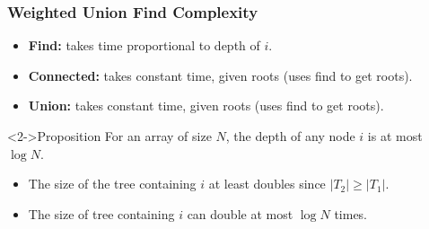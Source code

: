 \documentclass{beamer}
\begin{document}
\begin{frame}%
\frametitle{Weighted Union Find Complexity}

\scriptsize

\begin{itemize}
\item \textbf{Find:} takes time proportional to depth of $i$.\\

\vspace{0.1cm}

\item \textbf{Connected:} takes constant time, given roots (uses find to get roots).\\

\vspace{0.1cm}

\item \textbf{Union:} takes constant time, given roots (uses find to get roots).\\

\vspace{0.2cm}
\end{itemize}

\begin{block}<2->{Proposition}
For an array of size $N$, the depth of any node $i$ is at most $\log N$.
\end{block}
\begin{itemize}
\item<3-> The size of the tree containing $i$ at least doubles since $|T_2| \ge |T_1|$.
\item<4-> The size of tree containing $i$ can double at most $\log N$ times.
\end{itemize}


\end{frame}
\end{document}
